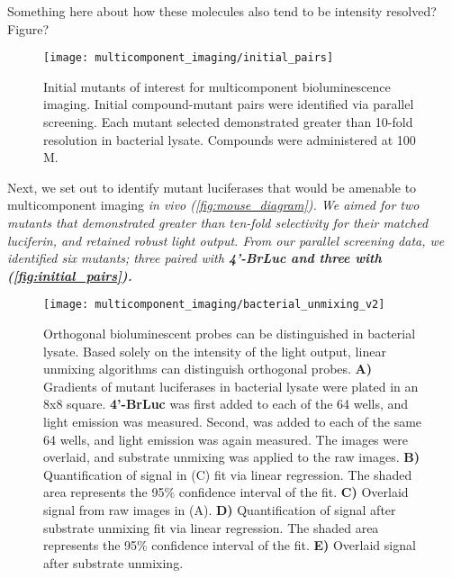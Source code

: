\begin{thoughts}
  Something here about how these molecules also tend to be intensity resolved? Figure?
\end{thoughts}

\begin{figure}[htbp]
\texttt{[image: multicomponent\_imaging/initial\_pairs]}
\centering
\caption[Initial mutants of interest for multicomponent bioluminescence imaging]{Initial mutants of interest for multicomponent bioluminescence imaging. Initial compound-mutant pairs were identified via parallel screening.\cite{RathbunParallelScreeningRapid2017} Each mutant selected demonstrated greater than 10-fold resolution in bacterial lysate. Compounds were administered at 100 \textmu{}M.
}
  \label{fig:initial_pairs}
\end{figure}

Next, we set out to identify mutant luciferases that would be amenable to multicomponent imaging \it{in vivo} (\autoref{fig:mouse_diagram}). We aimed for two mutants that demonstrated greater than ten-fold selectivity for their matched luciferin, and retained robust light output. From our parallel screening data, we identified six mutants; three paired with \bf{4'-BrLuc} and three with \dluc{} (\autoref{fig:initial_pairs}).


\begin{figure}[htbp]
\texttt{[image: multicomponent\_imaging/bacterial\_unmixing\_v2]}
\centering
\caption[Orthogonal bioluminescent probes can be distinguished in bacterial lysate]{
Orthogonal bioluminescent probes can be distinguished in bacterial lysate. Based solely on the intensity of the light output, linear unmixing algorithms can distinguish orthogonal probes. \textbf{A)} Gradients of mutant luciferases in bacterial lysate were plated in an 8x8 square. \textbf{4'-BrLuc} was first added to each of the 64 wells, and light emission was measured. Second, \dluc{} was added to each of the same 64 wells, and light emission was again measured. The images were overlaid, and substrate unmixing was applied to the raw images. \textbf{B)} Quantification of signal in (C) fit via linear regression. The shaded area represents the 95\% confidence interval of the fit. \textbf{C)} Overlaid signal from raw images in (A). \textbf{D)} Quantification of signal after substrate unmixing fit via linear regression. The shaded area represents the 95\% confidence interval of the fit. \textbf{E)} Overlaid signal after substrate unmixing.
}
  \label{fig:bacterial_unmixing}
\end{figure}

